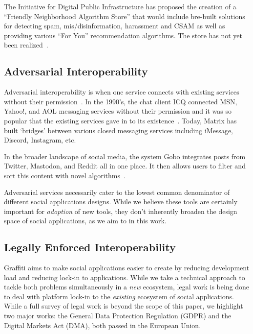 The Initiative for Digital Public Infrastructure has proposed the creation of a ``Friendly Neighborhood Algorithm Store'' that would include bre-built solutions for detecting spam, mis/disinformation, harassment and CSAM as well as providing various ``For You'' recommendation algorithms.
The store has not yet been realized~\cite{threeleggedstool}.

\subsection{Adversarial Interoperability}

Adversarial interoperability is when one service connects with existing services without their permission~\cite{adverserialinterop}.
In the 1990's, the chat client ICQ connected MSN, Yahoo!, and AOL messaging services without their permission and it was so popular that the existing services gave in to its existence~\cite{threeleggedstool}.
Today, Matrix has built `bridges' between various closed messaging services including iMessage, Discord, Instagram, etc.

In the broader landscape of social media, the system Gobo integrates posts from Twitter, Mastodon, and Reddit all in one place. It then allows users to filter and sort this content with novel algorithms~\cite{gobo}.

Adversarial services necessarily cater to the lowest common denominator of different social applications designs.
While we believe these tools are certainly important for \emph{adoption} of new tools, they don't inherently broaden the design space of social applications, as we aim to in this work.

\subsection{Legally Enforced Interoperability}

Graffiti aims to make social applications easier to create by reducing development load and reducing lock-in to applications.
While we take a technical approach to tackle both problems simultaneously in a \emph{new} ecosystem, legal work is being done to deal with platform lock-in to the \emph{existing} ecosystem of social applications.
While a full survey of legal work is beyond the scope of this paper, we highlight two major works: the General Data Protection Regulation (GDPR) and the Digital Markets Act (DMA), both passed in the European Union.


